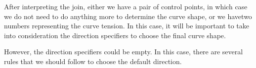 After interpreting the join, either we have a pair of control points,
in which case we do not need to do anything more to determine the
curve shape, or we havetwo numbers representing the curve tension. In
this case, it will be important to take into consideration the
direction specifiers to choose the final curve shape.

However, the direction specifiers could be empty. In this case, there
are several rules that we should follow to choose the default direction.






%


%


%


